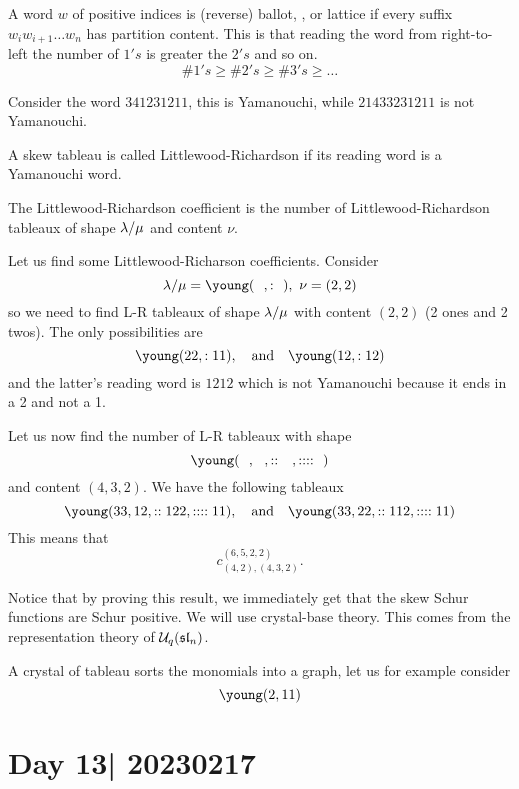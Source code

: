 \documentclass[12pt]{memoir}
\begin{document}
\begin{Def}
    A word $w$ of positive indices is (reverse) ballot, , or lattice if every suffix $w_iw_{i+1}\dots w_n$ has partition content. This is that reading the word from right-to-left the number of $1's$ is greater the $2's$ and so on. 
    $$\#1's\geq\#2's\geq\#3's\geq\dots$$
\end{Def}

\begin{Ex}
    Consider the word $341231211$, this is Yamanouchi, while $21433231211$ is not Yamanouchi.
\end{Ex}

\begin{Def}
    A skew tableau is called Littlewood-Richardson if its reading word is a Yamanouchi word.
\end{Def}

\begin{Th}
    The Littlewood-Richardson coefficient is the number of Littlewood-Richardson tableaux of shape $\lambda/\mu$ and content $\nu$.
\end{Th}

\begin{Ex}
    Let us find some Littlewood-Richarson coefficients. Consider 
    $$\la/\mu=\young(~~,:~~),\ \nu=(2,2)$$
    so we need to find L-R tableaux of shape $\lambda/\mu$ with content $(2,2)$ (2 ones and 2 twos). The only possibilities are 
    $$\young(22,:11),\word{and}\young(12,:12)$$
    and the latter's reading word is $1212$ which is not Yamanouchi because it ends in a 2 and not a 1.\par 
    Let us now find the number of L-R tableaux with shape 
    $$\young(~~,~~,::~~~,::::~~)$$
    and content $(4,3,2)$. We have the following tableaux
    $$\young(33,12,::122,::::11),\word{and}\young(33,22,::112,::::11)$$
    This means that 
    $$c^{(6,5,2,2)}_{(4,2),(4,3,2)}.$$
\end{Ex}

Notice that by proving this result, we immediately get that the skew Schur functions are Schur positive. We will use crystal-base theory. This comes from the representation theory of $\mathcal{U}_{q}(\mathfrak{sl}_n)$.\par 
A crystal of tableau sorts the monomials into a graph, let us for example consider 
$$\young(2,11)$$

\section{Day 13| 20230217}
\end{document}
